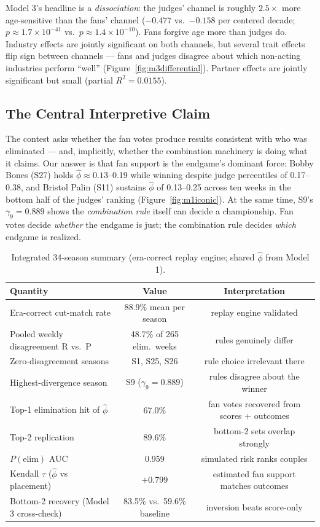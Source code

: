 \documentclass[10pt]{article}
\begin{document}
Model 3's headline is a \emph{dissociation}: the judges' channel is roughly
$2.5\times$ more age-sensitive than the fans' channel ($-0.477$ vs.\ $-0.158$ per centered
decade; $p \approx 1.7\times10^{-41}$ vs.\ $p \approx 1.4\times10^{-10}$). Fans forgive age
more than judges do. Industry effects are jointly significant on both channels, but several
trait effects flip sign between channels --- fans and judges disagree about which
non-acting industries perform ``well'' (Figure~\ref{fig:m3differential}). Partner effects
are jointly significant but small (partial $R^2 = 0.0155$).

\subsection{The Central Interpretive Claim}

The contest asks whether the fan votes produce results consistent with who was eliminated
--- and, implicitly, whether the combination machinery is doing what it claims. Our answer
is that fan support is the endgame's dominant force: Bobby Bones (S27) holds
$\hat\phi \approx 0.13$--0.19 while winning despite judge percentiles of 0.17--0.38, and
Bristol Palin (S11) sustains $\hat\phi$ of 0.13--0.25 across ten weeks in the bottom half
of the judges' ranking (Figure~\ref{fig:m1iconic}). At the same time, S9's
$\gamma_9 = 0.889$ shows the \emph{combination rule} itself can decide a championship.
Fan votes decide \emph{whether} the endgame is just; the combination rule decides
\emph{which} endgame is realized.

\begin{table}[H]
\centering
\caption{Integrated 34-season summary (era-correct replay engine; shared $\hat\phi$
from Model 1).}
\label{tab:integrated}
\begin{tabular}{lcc}
\toprule
Quantity & Value & Interpretation \\
\midrule
Era-correct cut-match rate & 88.9\% mean per season & replay engine validated \\
Pooled weekly disagreement R vs.\ P & 48.7\% of 265 elim.\ weeks & rules genuinely differ \\
Zero-disagreement seasons & S1, S25, S26 & rule choice irrelevant there \\
Highest-divergence season & S9 ($\gamma_9 = 0.889$) & rules disagree about the winner \\
Top-1 elimination hit of $\hat\phi$ & 67.0\% & fan votes recovered from scores + outcomes \\
Top-2 replication & 89.6\% & bottom-2 sets overlap strongly \\
$P(\text{elim})$ AUC & 0.959 & simulated risk ranks couples \\
Kendall $\tau$ ($\hat\phi$ vs placement) & $+0.799$ & estimated fan support matches outcomes \\
Bottom-2 recovery (Model 3 cross-check) & 83.5\% vs.\ 59.6\% baseline & inversion beats score-only \\
\bottomrule
\end{tabular}
\end{table}
\end{document}
